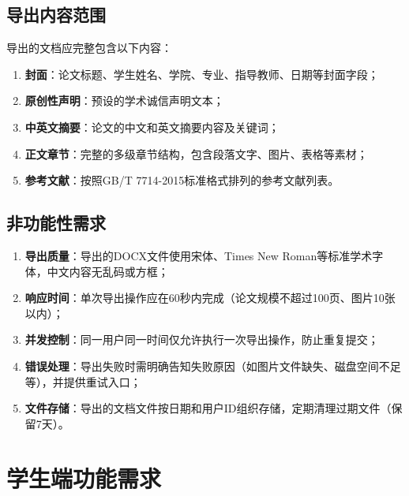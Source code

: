 \documentclass{../softeng}
\begin{document}
\subsection{导出内容范围}

导出的文档应完整包含以下内容：

\begin{enumerate}
    \item \textbf{封面}：论文标题、学生姓名、学院、专业、指导教师、日期等封面字段；
    \item \textbf{原创性声明}：预设的学术诚信声明文本；
    \item \textbf{中英文摘要}：论文的中文和英文摘要内容及关键词；
    \item \textbf{正文章节}：完整的多级章节结构，包含段落文字、图片、表格等素材；
    \item \textbf{参考文献}：按照GB/T 7714-2015标准格式排列的参考文献列表。
\end{enumerate}

\subsection{非功能性需求}

\begin{enumerate}
    \item \textbf{导出质量}：导出的DOCX文件使用宋体、Times New Roman等标准学术字体，中文内容无乱码或方框；
    \item \textbf{响应时间}：单次导出操作应在60秒内完成（论文规模不超过100页、图片10张以内）；
    \item \textbf{并发控制}：同一用户同一时间仅允许执行一次导出操作，防止重复提交；
    \item \textbf{错误处理}：导出失败时需明确告知失败原因（如图片文件缺失、磁盘空间不足等），并提供重试入口；
    \item \textbf{文件存储}：导出的文档文件按日期和用户ID组织存储，定期清理过期文件（保留7天）。
\end{enumerate}

\section{学生端功能需求}
\end{document}
